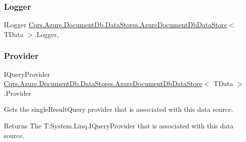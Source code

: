 \subsubsection{\texorpdfstring{Logger}{Logger}}
{\footnotesize\ttfamily I\+Logger \hyperlink{classCqrs_1_1Azure_1_1DocumentDb_1_1DataStores_1_1AzureDocumentDbDataStore}{Cqrs.\+Azure.\+Document\+Db.\+Data\+Stores.\+Azure\+Document\+Db\+Data\+Store}$<$ T\+Data $>$.Logger\hspace{0.3cm}{\ttfamily [get]}, {\ttfamily [protected]}}

\mbox{\label{classCqrs_1_1Azure_1_1DocumentDb_1_1DataStores_1_1AzureDocumentDbDataStore_ac7beb3868691d1cba378fa58e3f0e999_ac7beb3868691d1cba378fa58e3f0e999}} 
\subsubsection{\texorpdfstring{Provider}{Provider}}
{\footnotesize\ttfamily I\+Query\+Provider \hyperlink{classCqrs_1_1Azure_1_1DocumentDb_1_1DataStores_1_1AzureDocumentDbDataStore}{Cqrs.\+Azure.\+Document\+Db.\+Data\+Stores.\+Azure\+Document\+Db\+Data\+Store}$<$ T\+Data $>$.Provider\hspace{0.3cm}{\ttfamily [get]}}



Gets the single\+Result\+Query provider that is associated with this data source. 

\begin{DoxyReturn}{Returns}
The T\+:\+System.\+Linq.\+I\+Query\+Provider that is associated with this data source. 
\end{DoxyReturn}
